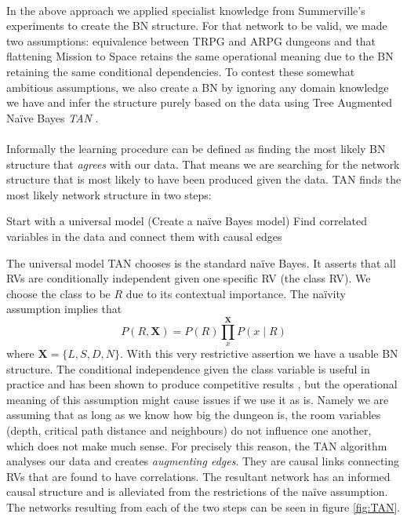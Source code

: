 \documentclass{UoYCSproject}
\begin{document}
\paragraph{}
In the above approach we applied specialist knowledge from Summerville's experiments to create the BN structure. For that network to be valid, we made two assumptions: equivalence between TRPG and ARPG dungeons and that flattening Mission to Space retains the same operational meaning due to the BN retaining the same conditional dependencies. To contest these somewhat ambitious assumptions, we also create a BN by ignoring any domain knowledge we have and infer the structure purely based on the data using Tree Augmented Na\"{i}ve Bayes \textit{TAN} \parencite{FriedmanTAN}.
\paragraph{}
Informally the learning procedure can be defined as finding the most likely BN structure that \textit{agrees} with our data. That means we are searching for the network structure that is most likely to have been produced given the data. TAN finds the most likely network structure in two steps:

\begin{outline}[enumerate]
  \1 Start with a universal model (Create a na\"{i}ve Bayes model)
  \1 Find correlated variables in the data and connect them with causal edges
\end{outline}

The universal model TAN chooses is the standard na\"{i}ve Bayes. It asserts that all RVs are conditionally independent given one specific RV (the class RV). We choose the class to be \(R\) due to its contextual importance. The na\"{i}vity assumption implies that
\begin{equation}
  \label{eq:TAN}
  P(R,\boldsymbol X) = P(R)\prod_{x}^{\boldsymbol X} P(x \mid R)
\end{equation}
where \(\boldsymbol X = \{L, S, D, N\}\). With this very restrictive assertion we have a usable BN structure. The conditional independence given the class variable is useful in practice and has been shown to produce competitive results \parencite{RishEmpiricalBayes}, but the operational meaning of this assumption might cause issues if we use it as is. Namely we are assuming that as long as we know how big the dungeon is, the room variables (depth, critical path distance and neighbours) do not influence one another, which does not make much sense. For precisely this reason, the TAN algorithm analyses our data and creates \textit{augmenting edges}. They are causal links connecting RVs that are found to have correlations. The resultant network has an informed causal structure and is alleviated from the restrictions of the na\"{i}ve assumption. The networks resulting from each of the two steps can be seen in figure \ref{fig:TAN}.
\end{document}

